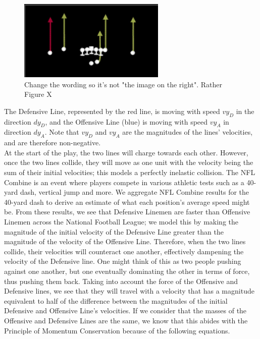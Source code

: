 \begin{figure}[htp]
    \centering
    \includegraphics[width=7cm]{figure/hailMary.png}
    \caption{Change the wording so it's not "the image on the right". Rather Figure X}
\end{figure}

The Defensive Line, represented by the red line, is moving with speed $vy_D$ in the direction $dy_D$, and the Offensive Line (blue) is moving with speed $vy_A$ in direction $dy_A$. Note that $vy_D$ and $vy_A$ are the magnitudes of the lines' velocities, and are therefore non-negative. \\
 

At the start of the play, the two lines will charge towards each other. However, once the two lines collide, they will move as one unit with the velocity being the sum of their initial velocities; this models a perfectly inelastic collision. The NFL Combine is an event where players compete in various athletic tests such as a 40-yard dash, vertical jump and more. We aggregate NFL Combine results for the 40-yard dash to derive an estimate of what each position's average speed might be. From these results, we see that Defensive Linemen are faster than Offensive Linemen across the National Football League; we model this by making the magnitude of the initial velocity of the Defensive Line greater than the magnitude of the velocity of the Offensive Line. Therefore, when the two lines collide, their velocities will counteract one another, effectively dampening the velocity of the Defensive line. One might think of this as two people pushing against one another, but one eventually dominating the other in terms of force, thus pushing them back. Taking into account the force of the Offensive and Defensive lines, we see that they will travel with a velocity that has a magnitude equivalent to half of the difference between the magnitudes of the initial Defensive and Offensive Line’s velocities. If we consider that the masses of the Offensive and Defensive Lines are the same, we know that this abides with the Principle of Momentum Conservation because of the following equations. \\

